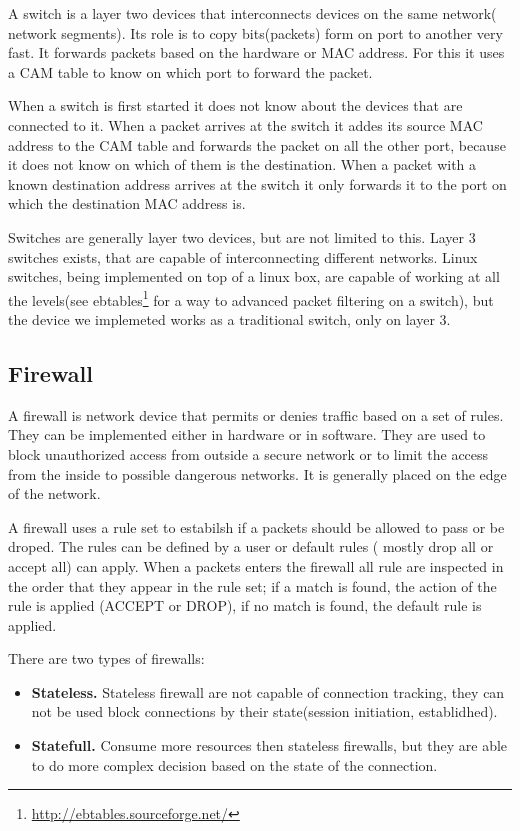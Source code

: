 A switch is a layer two devices that interconnects devices on the same network( network segments). Its role is 
to copy bits(packets) form on port to another very fast. It forwards packets based on the hardware or MAC address. 
For this it uses a CAM table to know on which port to forward the packet. 

When a switch is first started it does not know about the devices that are connected to it. When a packet arrives
at the switch it addes its source MAC address to the CAM table and forwards the packet on all the other port, because
it does not know on which of them is the destination. When a packet with a known destination address arrives at the
switch it only forwards it to the port on which the destination MAC address is.

Switches are generally layer two devices, but are not limited to this. Layer 3 switches exists, that are capable of 
interconnecting different networks. Linux switches, being implemented on top of a linux box, are capable of working
at all the levels(see ebtables\footnote{\url{http://ebtables.sourceforge.net/}} for a way to advanced packet filtering
on a switch), but the device we implemeted works as a traditional switch, only on layer 3.

\subsection{Firewall}
\label{sub-sec:firewall}

A firewall is network device that permits or denies traffic based on a set of rules. They can be implemented either in
hardware or in software. They are used to block unauthorized access from outside a secure network or to limit the access
from the inside to possible dangerous networks. It is generally placed on the edge of the network.

A firewall uses a rule set to estabilsh if a packets should be allowed to pass or be droped. The rules can be defined
by a user or default rules ( mostly drop all or accept all) can apply. When a packets enters the firewall all rule
are inspected in the order that they appear in the rule set; if a match is found, the action of the rule is applied
(ACCEPT or DROP), if no match is found, the default rule is applied.

There are two types of firewalls:
\begin{itemize}
  \item \textbf{Stateless.} Stateless firewall are not capable of connection tracking, they can not be used block
connections by their state(session initiation, establidhed). 
  \item \textbf{Statefull.} Consume more resources then stateless firewalls, but they are able to do more complex 
decision based on the state of the connection.
\end{itemize} 

